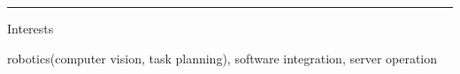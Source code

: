 \documentclass[a4paper,10pt]{article}
\newlength{\cvcolumngapwidth}
\newlength{\cvleftcolumnwidth}
\newlength{\cvrightcolumnwidth}
\newcommand{\cvsectionstyle}[1]{{\normalsize\cvsectionfont\textcolor{cvsectioncolor}{#1}}}
\newcommand{\cvheadingstyle}[1]{{\normalsize\cvheadingfont\textcolor{cvheadingcolor}{#1}}}
\newlength{\cvafteritemskipamount}
\newlength{\cvaftersectionskipamount}
\newlength{\cvbetweensectionandheadingextraskipamount}
\newlength{\cvparskip}
\newcommand{\cvsection}[1]{
    \begin{minipage}[t]{\cvleftcolumnwidth}
        \raggedleft\cvsectionstyle{#1}
    \end{minipage}%
    \hspace{\cvcolumngapwidth}%
    \begin{minipage}[t]{\cvrightcolumnwidth}
        \textcolor{cvrulecolor}{\rule{\cvrightcolumnwidth}{0.3mm}}
    \end{minipage}

    \vspace{\cvaftersectionskipamount}
}
\newcommand{\cvitem}[2]{
    \begin{minipage}[t]{\cvleftcolumnwidth}
        \raggedleft #1
    \end{minipage}%
    \hspace{\cvcolumngapwidth}%
    \begin{minipage}[t]{\cvrightcolumnwidth}
        \setlength{\parskip}{\cvparskip} #2
    \end{minipage}

    \vspace{\cvafteritemskipamount}
}
\begin{document}



\cvsection{ADDITIONAL INFORMATION}

\vspace{\cvbetweensectionandheadingextraskipamount}


\cvitem{
    \cvheadingstyle{Interests}
}{
    robotics(computer vision, task planning), software integration, server operation
}
\end{document}
